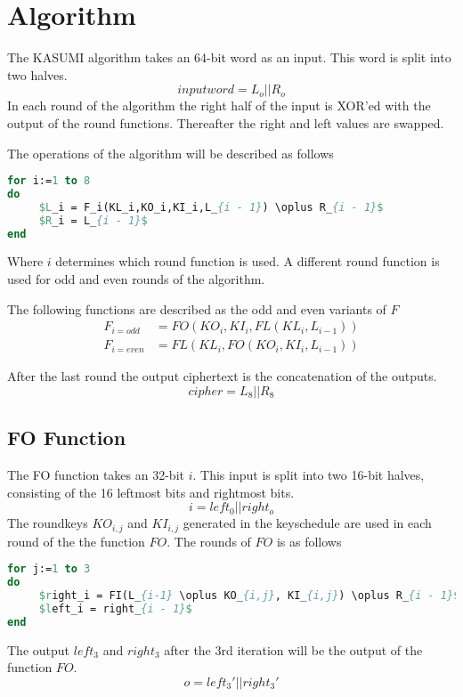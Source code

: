 \section{Algorithm}
The KASUMI algorithm takes an 64-bit word as an input. This word is
split into two halves.
\[ inputword = L_o || R_o\]
In each round of the algorithm the right half of the input is XOR'ed
with the output of the round functions. Thereafter the right and left
values are swapped.

The operations of the algorithm will be described as follows

\begin{lstlisting}[frame=single, language=Pascal, mathescape,
captionpos=b, caption={Pseudo code for KASUMI alogrithm}]
for i:=1 to 8
do
     $L_i = F_i(KL_i,KO_i,KI_i,L_{i - 1}) \oplus R_{i - 1}$
     $R_i = L_{i - 1}$
end
\end{lstlisting}

Where $i$ determines which round function is used. A different round
function is used for odd and even rounds of the algorithm.

The following functions are described as the odd and even variants of $F$
\begin{align*}
  F_{i = odd} &= FO(KO_i, KI_i, FL(KL_i, L_{i - 1}))\\
  F_{i = even} &= FL(KL_i, FO(KO_i,KI_i, L_{i - 1}))
\end{align*}

After the last round the output ciphertext is the concatenation of the
outputs.
\[cipher = L_8 || R_8\]

\subsection{FO Function}
The FO function takes an 32-bit $i$. This input is split into two
16-bit halves, consisting of the 16 leftmost bits and rightmost bits.
\[i = left_0 || right_o\]
The roundkeys $KO_{i,j}$ and $KI_{i,j}$ generated in the keyschedule
are used in each round of the the function $FO$.
The rounds of $FO$ is as follows
\begin{lstlisting}[frame=single, language=Pascal, mathescape,
captionpos=b, caption={Pseudo code for $FO$ function}]
for j:=1 to 3
do
     $right_i = FI(L_{i-1} \oplus KO_{i,j}, KI_{i,j}) \oplus R_{i - 1}$
     $left_i = right_{i - 1}$
end
\end{lstlisting}
The output $left_3$ and $right_3$ after the $3$rd iteration will be
the output of the function $FO$.
\[o = left_3' || right_3'\]
